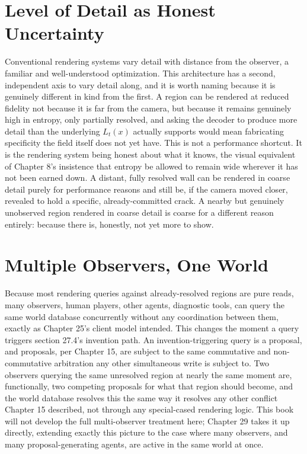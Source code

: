 \section{Level of Detail as Honest Uncertainty}

Conventional rendering systems vary detail with distance from the observer, a familiar and well-understood optimization. This architecture has a second, independent axis to vary detail along, and it is worth naming because it is genuinely different in kind from the first. A region can be rendered at reduced fidelity not because it is far from the camera, but because it remains genuinely high in entropy, only partially resolved, and asking the decoder to produce more detail than the underlying \(L_t(x)\) actually supports would mean fabricating specificity the field itself does not yet have. This is not a performance shortcut. It is the rendering system being honest about what it knows, the visual equivalent of Chapter 8's insistence that entropy be allowed to remain wide wherever it has not been earned down. A distant, fully resolved wall can be rendered in coarse detail purely for performance reasons and still be, if the camera moved closer, revealed to hold a specific, already-committed crack. A nearby but genuinely unobserved region rendered in coarse detail is coarse for a different reason entirely: because there is, honestly, not yet more to show.

\section{Multiple Observers, One World}

Because most rendering queries against already-resolved regions are pure reads, many observers, human players, other agents, diagnostic tools, can query the same world database concurrently without any coordination between them, exactly as Chapter 25's client model intended. This changes the moment a query triggers section 27.4's invention path. An invention-triggering query is a proposal, and proposals, per Chapter 15, are subject to the same commutative and non-commutative arbitration any other simultaneous write is subject to. Two observers querying the same unresolved region at nearly the same moment are, functionally, two competing proposals for what that region should become, and the world database resolves this the same way it resolves any other conflict Chapter 15 described, not through any special-cased rendering logic. This book will not develop the full multi-observer treatment here; Chapter 29 takes it up directly, extending exactly this picture to the case where many observers, and many proposal-generating agents, are active in the same world at once.

